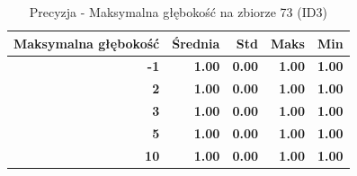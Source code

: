 \begin{table}[htbp]
\centering
\small
\setlength{\tabcolsep}{6pt}
\renewcommand{\arraystretch}{1.2}
\caption{Precyzja - Maksymalna głębokość na zbiorze 73 (ID3)}
\label{tab:ID3_max_depth_73_precision}
\begin{tabular}{r|r|r|r|r}
\toprule
Maksymalna głębokość & Średnia & Std & Maks & Min \\
\hline
\textbf{-1} & \textbf{1.00} & \textbf{0.00} & \textbf{1.00} & \textbf{1.00} \\
\textbf{2} & \textbf{1.00} & \textbf{0.00} & \textbf{1.00} & \textbf{1.00} \\
\textbf{3} & \textbf{1.00} & \textbf{0.00} & \textbf{1.00} & \textbf{1.00} \\
\textbf{5} & \textbf{1.00} & \textbf{0.00} & \textbf{1.00} & \textbf{1.00} \\
\textbf{10} & \textbf{1.00} & \textbf{0.00} & \textbf{1.00} & \textbf{1.00} \\
\bottomrule
\end{tabular}
\end{table}
